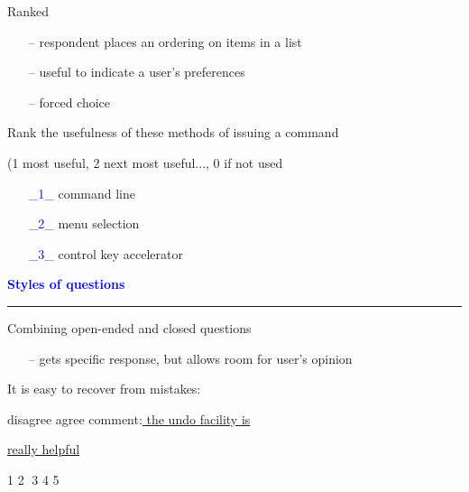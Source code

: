\documentclass[pdf]{beamer}
\begin{document}
{{{{{{{{{\begin{frame}
    {\LARGE Ranked}
    \begin{itemize}
      \item[\textcolor{Blue}{--}] respondent places an ordering on items in a list 
      \item[\textcolor{Blue}{--}] useful to indicate a user’s preferences
      \item[\textcolor{Blue}{--}] forced choice
    \end{itemize}
    \vspace{5mm}
    Rank the usefulness of these methods of issuing a command\par
	(1 most useful, 2 next most useful..., 0 if not used
    \begin{itemize}
      \item[\textcolor{Blue}{\_1\_}] command line
      \item[\textcolor{Blue}{\_2\_}] menu selection
      \item[\textcolor{Blue}{\_3\_}] control key accelerator
    \end{itemize}
\end{frame}



{
\begin{frame}
	\vspace{8mm}
	\textcolor{Blue}{\textbf{\large{Styles of questions}}}
    \textcolor{red}{\rule{10cm}{1mm}}
    
    {\LARGE Combining open-ended and closed questions}\par
    \begin{itemize}
      \item[\textcolor{Blue}{--}] gets specific response, but allows room for user’s opinion
	\end{itemize}
    \vspace{4mm}
    It is easy to recover from mistakes:\par
    \vspace{4mm}
    disagree \hspace{16mm} agree \hspace{4mm} comment:\underline{ the undo facility is} \par
    \underline{really helpful} \par
    {\large\hspace{10mm} 1\hspace{3mm} \textcircled{2}\hspace{3mm} 3\hspace{3mm} 4\hspace{3mm} 5}


\end{frame}}}}}}}}}}}
\end{document}
